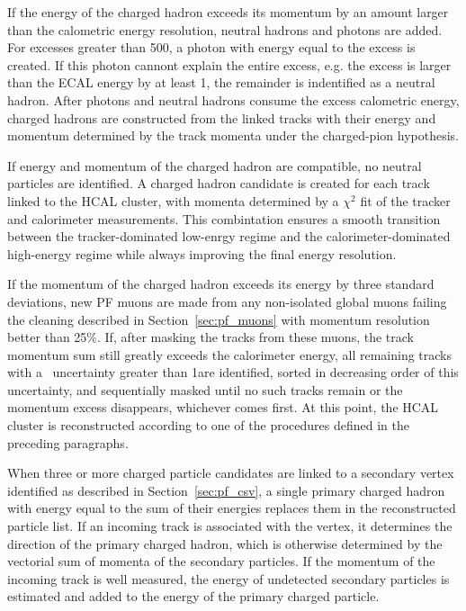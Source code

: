 If the energy of the charged hadron exceeds its momentum by an amount larger than the calometric energy resolution, neutral hadrons and photons are added.
For excesses greater than 500\MeV, a photon with energy equal to the excess is created.
If this photon cannont explain the entire excess, e.g. the excess is larger than the ECAL energy by at least 1\GeV, the remainder is indentified as a neutral hadron. 
After photons and neutral hadrons consume the excess calometric energy, charged hadrons are constructed from the linked tracks with their energy and momentum determined by the track momenta under the charged-pion hypothesis. 

If energy and momentum of the charged hadron are compatible, no neutral particles are identified. A charged hadron candidate is created for each track linked to the HCAL cluster, with momenta determined by a $\chi^2$ fit of the tracker and calorimeter measurements.
This combintation ensures a smooth transition between the tracker-dominated low-enrgy regime and the calorimeter-dominated high-energy regime while always improving the final energy resolution. 

If the momentum of the charged hadron exceeds its energy by three standard deviations, new PF muons are made from any non-isolated global muons failing the cleaning described in Section~\ref{sec:pf_muons} with momentum resolution better than 25\%.
If, after masking the tracks from these muons, the track momentum sum still greatly exceeds the calorimeter energy, all remaining tracks with a \pt\ uncertainty greater than 1\GeV are identified, sorted in decreasing order of this uncertainty, and sequentially masked until no such tracks remain or the momentum excess disappears, whichever comes first. 
At this point, the HCAL cluster is reconstructed according to one of the procedures defined in the preceding paragraphs.

When three or more charged particle candidates are linked to a secondary vertex identified as described in Section~\ref{sec:pf_csv}, a single primary charged hadron with energy equal to the sum of their energies replaces them in the reconstructed particle list.
If an incoming track is associated with the vertex, it determines the direction of the primary charged hadron, which is otherwise determined by the vectorial sum of momenta of the secondary particles.
If the momentum of the incoming track is well measured, the energy of undetected secondary particles is estimated and added to the energy of the primary charged particle.

